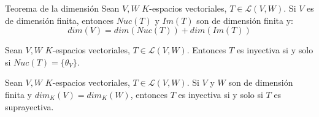 \begin{theorem}{Teorema de la dimensión}{}
        Sean $V,W$ $K$-espacios vectoriales, $T \in \mathcal{L}(V,W)$. Si $V$ es de dimensión finita, entonces $Nuc(T)$ y $Im(T)$ son de dimensión finita y:
        $$dim(V) = dim(Nuc(T)) + dim(Im(T))$$
\end{theorem}


\begin{theorem}{}{}
    Sean $V,W$ $K$-espacios vectoriales, $T \in \mathcal{L}(V,W)$. Entonces $T$ es inyectiva si y solo si $Nuc(T) = \{\theta_V\}$.
\end{theorem}
\begin{corollary}{}{}
    Sean $V,W$ $K$-espacios vectoriales, $T \in \mathcal{L}(V,W)$. Si $V$ y $W$ son de dimensión finita y $dim_K(V) = dim_K(W)$, entonces $T$ es inyectiva si y solo si $T$ es suprayectiva.
\end{corollary}

